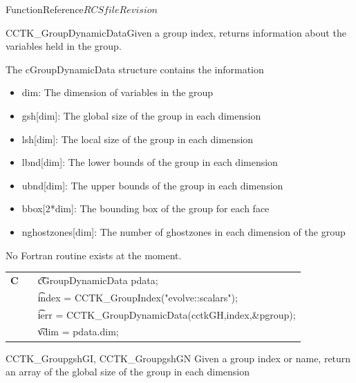 \begin{cactuspart}{FunctionReference}{$RCSfile$}{$Revision$}
\begin{CCTKFunc}{CCTK\_GroupDynamicData}{Given a group index, returns information about the variables held in the group.}
\label{CCTK-GroupDynamicData}
\showcargs
\begin{params}
\end{params}
\begin{discussion}
The cGroupDynamicData structure contains the information
\begin{itemize}
\item dim: The dimension of variables in the group
\item gsh[dim]: The global size of the group in each dimension
\item lsh[dim]: The local size of the group in each dimension
\item lbnd[dim]: The lower bounds of the group in each dimension
\item ubnd[dim]: The upper bounds of the group in each dimension
\item bbox[2*dim]: The bounding box of the group for each face
\item nghostzones[dim]: The number of ghostzones in each dimension of the group
\end{itemize}
No Fortran routine exists at the moment.
\end{discussion}
\begin{examples}
\begin{tabular}{@{}p{3cm}cp{11cm}}
\hfill {\bf C} && {\t cGroupDynamicData pdata;}\\
               && {\t index = CCTK\_GroupIndex("evolve::scalars");}\\
               &&{\t ierr = CCTK\_GroupDynamicData(cctkGH,index,\&pgroup);}\\
               && {\t vdim = pdata.dim;}
\\
\end{tabular}
\end{examples}
\begin{errorcodes}
\end{errorcodes}
\end{CCTKFunc}


\begin{FunctionDescription}{CCTK\_GroupgshGI, CCTK\_GroupgshGN}
\label{CCTK-GroupgshGI}
\label{CCTK-GroupgshGN}
Given a group index or name, return an array of the global size of the group in each dimension


\end{FunctionDescription}
\end{cactuspart}
